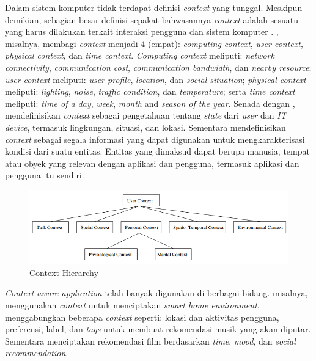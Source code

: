 Dalam sistem komputer tidak terdapat definisi \textit{context} yang tunggal. Meskipun demikian, sebagian besar definisi sepakat bahwasannya \textit{context} adalah sesuatu yang harus dilakukan terkait interaksi pengguna dan sistem komputer \citep{chen_survey_2000}. \citep{schilit_context-aware_1994}, misalnya, membagi \textit{context} menjadi 4 (empat): \textit{computing context}, \textit{user context}, \textit{physical context}, dan \textit{time context}. \textit{Computing context} meliputi: \textit{network connectivity}, \textit{communication cost}, \textit{communication bandwidth}, dan \textit{nearby resource}; \textit{user context} meliputi: \textit{user profile}, \textit{location}, dan \textit{social situation}; \textit{physical context} meliputi: \textit{lighting}, \textit{noise}, \textit{traffic condition}, dan \textit{temperature}; serta \textit{time context} meliputi: \textit{time of a day}, \textit{week}, \textit{month} and \textit{season of the year}. Senada dengan \citep{schilit_context-aware_1994}, \citep{schmidt_there_1999} mendefinisikan \textit{context} sebagai pengetahuan tentang \textit{state} dari \textit{user} dan \textit{IT device}, termasuk lingkungan, situasi, dan lokasi. Sementara \citep{abowd_towards_1999} mendefinisikan \textit{context} sebagai segala informasi yang dapat digunakan untuk mengkarakterisasi kondisi dari suatu entitas. Entitas yang dimaksud dapat berupa manusia, tempat atau obyek yang relevan dengan aplikasi dan pengguna, termasuk aplikasi dan pengguna itu sendiri. 


\begin{figure}[h]
    \centering
    \includegraphics[width=\textwidth]{../../Resources/Images/context}
    \caption{Context Hierarchy \citep{kofod-petersen_case-based_2003}}
    \label{fig:capi-ilustration}
\end{figure}


\textit{Context-aware application} telah banyak digunakan di berbagai bidang. \citep{tsai_context-aware_2016} misalnya, menggunakan \textit{context} untuk menciptakan \textit{smart home environment}. \citep{magara_mplist:_2016} menggabungkan beberapa \textit{context} seperti: lokasi dan aktivitas pengguna, preferensi, label, dan \textit{tags} untuk membuat rekomendasi musik yang akan diputar. Sementara \citep{said_introduction_2013} menciptakan rekomendasi film berdasarkan \textit{time}, \textit{mood}, dan \textit{social recommendation}.


